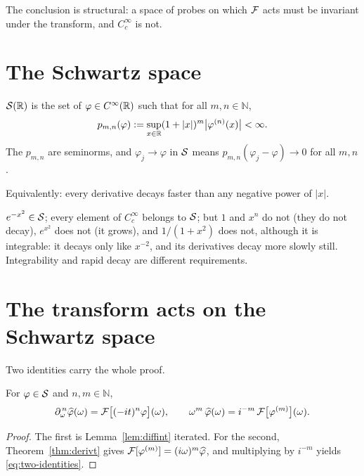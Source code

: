 The conclusion is structural: a space of probes on which $\mathcal{F}$ acts must be invariant under the
transform, and $C_{c}^{\infty}$ is not.

\section{The Schwartz space}

\begin{definition}\label{def:S}
$\mathcal{S}(\mathbb{R})$ is the set of $\varphi\in C^{\infty}(\mathbb{R})$ such that for all $m,n\in\mathbb{N}$,
\begin{equation}
p_{m,n}(\varphi):=\sup_{x\in\mathbb{R}}(1+|x|)^{m}\big|\varphi^{(n)}(x)\big|<\infty .
\label{eq:seminorm}
\end{equation}
The $p_{m,n}$ are seminorms, and $\varphi_{j}\to\varphi$ in $\mathcal{S}$ means
$p_{m,n}(\varphi_{j}-\varphi)\to0$ for all $m,n$.
\end{definition}

Equivalently: every derivative decays faster than any negative power of $|x|$.

\begin{example}\label{ex:S}
$e^{-x^{2}}\in\mathcal{S}$; every element of $C_{c}^{\infty}$ belongs to $\mathcal{S}$; but $1$ and $x^{n}$ do not
(they do not decay), $e^{x^{2}}$ does not (it grows), and $1/(1+x^{2})$ does not, although it is
integrable: it decays only like $x^{-2}$, and its derivatives decay more slowly still. Integrability
and rapid decay are different requirements.
\end{example}

\section{The transform acts on the Schwartz space}

Two identities carry the whole proof.

\begin{lemma}\label{lem:two-identities}
For $\varphi\in\mathcal{S}$ and $n,m\in\mathbb{N}$,
\begin{equation}
\partial_{\omega}^{\,n}\widehat{\varphi}(\omega)=\mathcal{F}\big[(-it)^{n}\varphi\big](\omega),
\qquad
\omega^{m}\,\widehat{\varphi}(\omega)=i^{-m}\,\mathcal{F}\big[\varphi^{(m)}\big](\omega).
\label{eq:two-identities}
\end{equation}
\end{lemma}

\begin{proof}
The first is Lemma~\ref{lem:diffint} iterated. For the second, Theorem~\ref{thm:derivt} gives
$\mathcal{F}[\varphi^{(m)}]=(i\omega)^{m}\widehat{\varphi}$, and multiplying by $i^{-m}$ yields \eqref{eq:two-identities}.
\end{proof}

